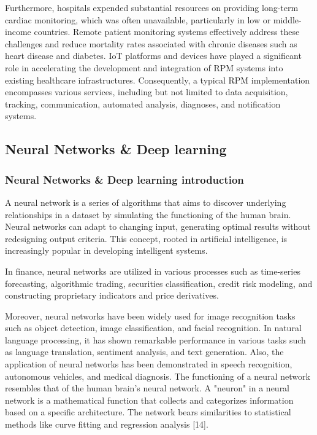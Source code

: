 Furthermore, hospitals expended substantial resources on providing long-term cardiac monitoring, which was often unavailable, particularly in low or middle-income countries. 
Remote patient monitoring systems effectively address these challenges and reduce mortality rates associated with chronic diseases such as heart disease and diabetes. IoT platforms and devices have played a significant role in accelerating the development and integration of RPM systems into existing healthcare infrastructures. Consequently, a typical RPM implementation encompasses various services, including but not limited to data acquisition, tracking, communication, automated analysis, diagnoses, and notification systems.

\subsection{Neural Networks & Deep learning}
\subsubsection{Neural Networks & Deep learning introduction}
A neural network is a series of algorithms that aims to discover underlying relationships in a dataset by simulating the functioning of the human brain. Neural networks can adapt to changing input, generating optimal results without redesigning output criteria. 
This concept, rooted in artificial intelligence, is increasingly popular in developing intelligent systems.

In finance, neural networks are utilized in various processes such as time-series forecasting, algorithmic trading, securities classification, credit risk modeling, and constructing proprietary indicators and price derivatives.

Moreover, neural networks have been widely used for image recognition tasks such as object detection, image classification, and facial recognition. In natural language processing, it has shown remarkable performance in various tasks such as language translation, sentiment analysis, and text generation. 
Also, the application of neural networks has been demonstrated in speech recognition, autonomous vehicles, and medical diagnosis. 
The functioning of a neural network resembles that of the human brain's neural network. A "neuron" in a neural network is a mathematical function that collects and categorizes information based on a specific architecture. The network bears similarities to statistical methods like curve fitting and regression analysis [14].

